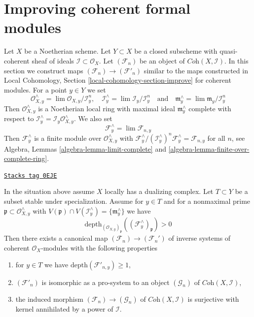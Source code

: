 \section{Improving coherent formal modules}
\label{algebraization-section-improving-formal-modules}
Let $X$ be a Noetherian scheme. Let $Y \subset X$ be a closed subscheme
with quasi-coherent sheaf of ideals $\mathcal{I} \subset \mathcal{O}_X$.
Let $(\mathcal{F}_n)$ be an object of $\textit{Coh}(X, \mathcal{I})$.
In this section we construct maps
$(\mathcal{F}_n) \to (\mathcal{F}'_n)$
similar to the maps constructed in
Local Cohomology, Section \ref{local-cohomology-section-improve}
for coherent modules. For a point $y \in Y$ we set
$$
\mathcal{O}_{X, y}^\wedge = \lim \mathcal{O}_{X, y}/\mathcal{I}^n_y, \quad
\mathcal{I}_y^\wedge = \lim \mathcal{I}_y/\mathcal{I}^n_y
\quad\text{and}\quad
\mathfrak m_y^\wedge = \lim \mathfrak m_y/\mathcal{I}_y^n
$$
Then $\mathcal{O}_{X, y}^\wedge$ is a Noetherian local ring
with maximal ideal $\mathfrak m_y^\wedge$ complete with respect to
$\mathcal{I}_y^\wedge = \mathcal{I}_y\mathcal{O}_{X, y}^\wedge$.
We also set
$$
\mathcal{F}_y^\wedge = \lim \mathcal{F}_{n, y}
$$
Then $\mathcal{F}_y^\wedge$ is a finite module over
$\mathcal{O}_{X, y}^\wedge$ with
$\mathcal{F}_y^\wedge/(\mathcal{I}_y^\wedge)^n\mathcal{F}_y^\wedge =
\mathcal{F}_{n, y}$ for all $n$, see Algebra, Lemmas
\ref{algebra-lemma-limit-complete} and
\ref{algebra-lemma-finite-over-complete-ring}.

\begin{lemma}
\label{algebraization-lemma-divide-torsion-formal-coherent-module}
\href{https://stacks.math.columbia.edu/tag/0EJE}{\texttt{Stacks tag 0EJE}}

In the situation above assume $X$ locally has a dualizing complex.
Let $T \subset Y$ be a subset stable under specialization.
Assume for $y \in T$ and for a nonmaximal prime
$\mathfrak p \subset \mathcal{O}_{X, y}^\wedge$ with
$V(\mathfrak p) \cap V(\mathcal{I}^\wedge_y) = \{\mathfrak m_y^\wedge\}$
we have
$$
\text{depth}_{(\mathcal{O}_{X, y})_\mathfrak p}
((\mathcal{F}^\wedge_y)_\mathfrak p) > 0
$$
Then there exists a canonical map
$(\mathcal{F}_n) \to (\mathcal{F}_n')$
of inverse systems of coherent $\mathcal{O}_X$-modules
with the following properties
\begin{enumerate}
\item for $y \in T$ we have $\text{depth}(\mathcal{F}'_{n, y}) \geq 1$,
\item $(\mathcal{F}'_n)$ is isomorphic as a pro-system to an object
$(\mathcal{G}_n)$ of $\textit{Coh}(X, \mathcal{I})$,
\item the induced morphism
$(\mathcal{F}_n) \to (\mathcal{G}_n)$ of
$\textit{Coh}(X, \mathcal{I})$ is surjective with kernel
annihilated by a power of $\mathcal{I}$.
\end{enumerate}
\end{lemma}

